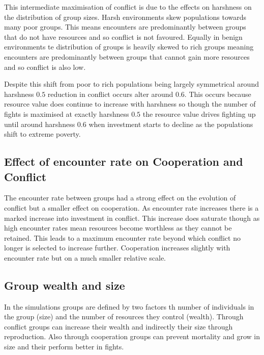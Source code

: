 This intermediate maximisation of conflict is due to the effects on harshness on the distribution of group sizes. Harsh environments skew populations towards many poor groups. This means encounters are predominantly between groups that do not have resources and so conflict is not favoured. Equally in benign environments te distribution of groups is heavily skewed to rich groups meaning encounters are predominantly between groups that cannot gain more resources and so conflict is also low. 

Despite this shift from poor to rich populations being largely symmetrical around harshness $0.5$ reduction in conflict occurs alter around $0.6$. This occurs because resource value does continue to increase with harshness so though the number of fights is maximised at exactly harshness $0.5$ the resource value drives fighting up until around harshness $0.6$ when investment starts to decline as the populations shift to extreme poverty. 

\subsection{Effect of encounter rate on Cooperation and Conflict}
The encounter rate between groups had a strong effect on the evolution of conflict but a smaller effect on cooperation. As encounter rate increases there is a marked increase into investment in conflict. This increase does saturate though as high encounter rates mean resources become worthless as they cannot be retained. This leads to a maximum encounter rate beyond which conflict no longer is selected to increase further. Cooperation increases slightly with encounter rate but on a much smaller relative scale. 

\subsection{Group wealth and size}
In the simulations groups are defined by two factors th number of individuals in the group (size) and the number of resources they control (wealth). Through conflict groups can increase their wealth and indirectly their size through reproduction. Also through cooperation groups can prevent mortality and grow in size and their perform better in fights. 


